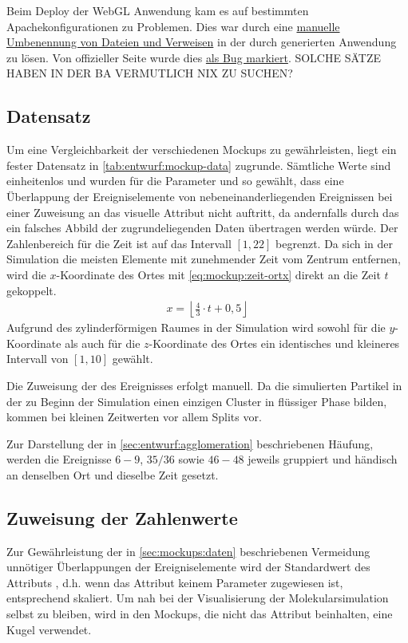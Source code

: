 Beim Deploy der  WebGL Anwendung kam es auf bestimmten Apachekonfigurationen zu Problemen. Dies war durch eine \href{http://forum.unity3d.com/threads/html-mem-causes-http-500-internal-server-error-on-apache.309762/}{manuelle Umbenennung von Dateien und Verweisen} in der durch  generierten Anwendung zu lösen. Von offizieller Seite wurde dies \href{http://forum.unity3d.com/threads/html-mem-causes-http-500-internal-server-error-on-apache.309762/#post-2014787}{als Bug markiert}. SOLCHE SÄTZE HABEN IN DER BA VERMUTLICH NIX ZU SUCHEN?

\subsection{Datensatz}\label{sec:mockups:daten}
Um eine Vergleichbarkeit der verschiedenen Mockups zu gewährleisten, liegt ein fester Datensatz in \autoref{tab:entwurf:mockup-data} zugrunde. Sämtliche Werte sind einheitenlos und wurden für die Parameter  und  so gewählt, dass eine Überlappung der Ereigniselemente von nebeneinanderliegenden Ereignissen bei einer Zuweisung an das visuelle Attribut  nicht auftritt, da andernfalls durch das  ein falsches Abbild der zugrundeliegenden Daten übertragen werden würde. Der Zahlenbereich für die Zeit ist auf das Intervall $[1,22]$ begrenzt. Da sich in der Simulation die meisten Elemente mit zunehmender Zeit vom Zentrum entfernen, wird die $x$-Koordinate des Ortes mit \autoref{eq:mockup:zeit-ortx} direkt an die Zeit $t$ gekoppelt.
\begin{align}\label{eq:mockup:zeit-ortx}
	x = \left\lfloor\frac 43\cdot t + 0,5\right\rfloor
\end{align}
Aufgrund des zylinderförmigen Raumes in der Simulation wird sowohl für die $y$-Koordinate als auch für die $z$-Koordinate des Ortes ein identisches und kleineres Intervall von $[1,10]$ gewählt.

Die Zuweisung der  des Ereignisses erfolgt manuell. Da die simulierten Partikel in der  zu Beginn der Simulation einen einzigen Cluster in flüssiger Phase bilden, kommen bei kleinen Zeitwerten vor allem Splits vor.

Zur Darstellung der in \autoref{sec:entwurf:agglomeration} beschriebenen Häufung, werden die Ereignisse $6-9$, $35/36$ sowie $46-48$ jeweils gruppiert und händisch an denselben Ort und dieselbe Zeit gesetzt.


\subsection{Zuweisung der Zahlenwerte}
Zur Gewährleistung der in \autoref{sec:mockups:daten} beschriebenen Vermeidung unnötiger Überlappungen der Ereigniselemente wird der Standardwert des Attributs , d.h. wenn das Attribut keinem Parameter zugewiesen ist, entsprechend skaliert. Um nah bei der Visualisierung der Molekularsimulation selbst zu bleiben, wird in den Mockups, die nicht das Attribut  beinhalten, eine Kugel verwendet. 

